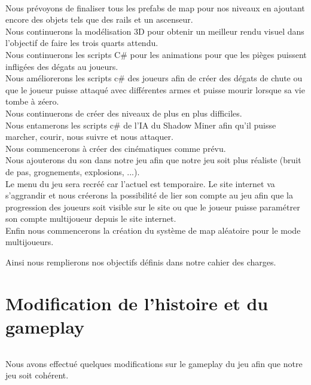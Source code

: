 \documentclass[titlepage, 13px, a4paper]{article}
\begin{document}
\paragraph{} \hspace{0pt} 
Nous prévoyons de finaliser tous les prefabs de map pour nos niveaux en ajoutant encore des objets tels que des rails et un ascenseur.\\
Nous continuerons la modélisation 3D pour obtenir un meilleur rendu visuel dans l'objectif de faire les trois quarts attendu. \\
Nous continuerons les scripts C\# pour les animations pour que les pièges puissent infligées des dégats au joueurs. \\
Nous améliorerons les scripts c\# des joueurs afin de créer des dégats de chute ou que le joueur puisse attaqué avec différentes armes et puisse mourir lorsque sa vie tombe à zéero.\\
Nous continuerons de créer des niveaux de plus en plus difficiles. \\
Nous entamerons les scripts c\# de l'IA du Shadow Miner afin qu'il puisse marcher, courir, nous suivre et nous attaquer.\\
Nous commencerons à créer des cinématiques comme prévu. \\
Nous ajouterons du son dans notre jeu afin que notre jeu soit plus réaliste (bruit de pas, grognements, explosions, ...). \\
Le menu du jeu sera recréé car l'actuel est temporaire.
Le site internet va s'aggrandir et nous créerons la possibilité de lier son compte au jeu afin que la progression des joueurs soit visible 
sur le site ou que le joueur puisse paramétrer son compte multijoueur depuis le site internet. \\
Enfin nous commencerons la création du système de map aléatoire pour le mode multijoueurs.

Ainsi nous remplierons nos objectifs définis dans notre cahier des charges.


\newpage

\part{Modification de l'histoire et du gameplay}

\paragraph{} \hspace{0pt}
Nous avons effectué quelques modifications sur le gameplay du jeu afin que notre jeu soit cohérent.
\end{document}
